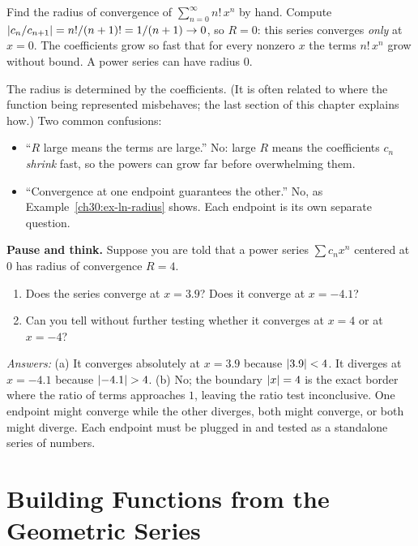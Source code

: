 \begin{labbox}
Find the radius of convergence of $\displaystyle\sum_{n=0}^{\infty} n!\, x^n$ by hand. Compute $\lvert c_n/c_{n+1}\rvert = n!/(n+1)! = 1/(n+1) \to 0$, so $R = 0$: this series converges \emph{only} at $x=0$. The coefficients grow so fast that for every nonzero $x$ the terms $n!\,x^n$ grow without bound. A power series can have radius $0$.
\end{labbox}

\begin{trapbox}
The radius is determined by the coefficients. (It is often related to where the function being represented misbehaves; the last section of this chapter explains how.) Two common confusions:
\begin{itemize}
  \item ``$R$ large means the terms are large.'' No: large $R$ means the coefficients $c_n$ \emph{shrink} fast, so the powers can grow far before overwhelming them.
  \item ``Convergence at one endpoint guarantees the other.'' No, as Example~\ref{ch30:ex-ln-radius} shows. Each endpoint is its own separate question.
\end{itemize}
\end{trapbox}

\begin{recoverybox}
\textbf{Pause and think.} Suppose you are told that a power series $\sum c_n x^n$ centered at $0$ has radius of convergence $R = 4$.
\begin{enumerate}[label=(\alph*)]
  \item Does the series converge at $x = 3.9$? Does it converge at $x = -4.1$?
  \item Can you tell without further testing whether it converges at $x = 4$ or at $x = -4$?
\end{enumerate}
\emph{Answers:} (a) It converges absolutely at $x = 3.9$ because $\lvert3.9\rvert < 4$. It diverges at $x = -4.1$ because $\lvert-4.1\rvert > 4$. (b) No; the boundary $\lvert x\rvert = 4$ is the exact border where the ratio of terms approaches $1$, leaving the ratio test inconclusive. One endpoint might converge while the other diverges, both might converge, or both might diverge. Each endpoint must be plugged in and tested as a standalone series of numbers.
\end{recoverybox}

\section{Building Functions from the Geometric Series}
\label{ch30:sec-building}

